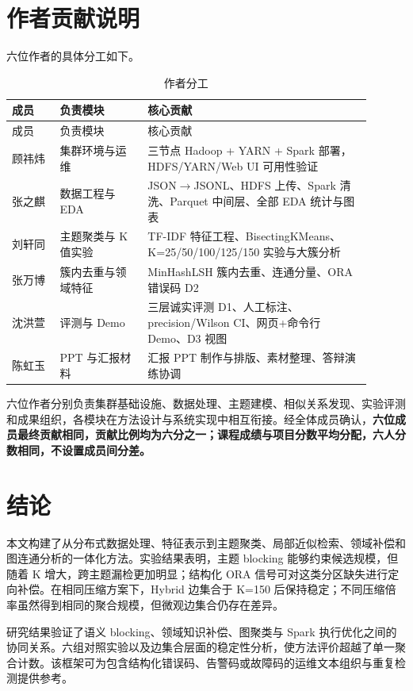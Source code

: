 \documentclass[a4paper,UTF8,zihao=5,fontset=windows]{ctexart}
\begin{document}
\section{作者贡献说明}

六位作者的具体分工如下。

\begin{longtable}{p{0.12\linewidth}p{0.22\linewidth}p{0.56\linewidth}}
\caption{作者分工}\\
\toprule
成员 & 负责模块 & 核心贡献 \\
\midrule
\endfirsthead
\toprule
成员 & 负责模块 & 核心贡献 \\
\midrule
\endhead
\bottomrule
\endlastfoot
顾祎炜 & 集群环境与运维 & 三节点 Hadoop + YARN + Spark 部署，HDFS/YARN/Web UI 可用性验证 \\
张之麒 & 数据工程与 EDA & JSON$\rightarrow$JSONL、HDFS 上传、Spark 清洗、Parquet 中间层、全部 EDA 统计与图表 \\
刘轩同 & 主题聚类与 K 值实验 & TF-IDF 特征工程、BisectingKMeans、K=25/50/100/125/150 实验与大簇分析 \\
张万博 & 簇内去重与领域特征 & MinHashLSH 簇内去重、连通分量、ORA 错误码 D2 \\
沈洪萱 & 评测与 Demo & 三层诚实评测 D1、人工标注、precision/Wilson CI、网页+命令行 Demo、D3 视图 \\
陈虹玉 & PPT 与汇报材料 & 汇报 PPT 制作与排版、素材整理、答辩演练协调 \\
\end{longtable}

六位作者分别负责集群基础设施、数据处理、主题建模、相似关系发现、实验评测和成果组织，各模块在方法设计与系统实现中相互衔接。经全体成员确认，\textbf{六位成员最终贡献相同，贡献比例均为六分之一；课程成绩与项目分数平均分配，六人分数相同，不设置成员间分差。}

\section{结论}

本文构建了从分布式数据处理、特征表示到主题聚类、局部近似检索、领域补偿和图连通分析的一体化方法。实验结果表明，主题 blocking 能够约束候选规模，但随着 K 增大，跨主题漏检更加明显；结构化 ORA 信号可对这类分区缺失进行定向补偿。在相同压缩方案下，Hybrid 边集合于 K=150 后保持稳定；不同压缩倍率虽然得到相同的聚合规模，但微观边集合仍存在差异。

研究结果验证了语义 blocking、领域知识补偿、图聚类与 Spark 执行优化之间的协同关系。六组对照实验以及边集合层面的稳定性分析，使方法评价超越了单一聚合计数。该框架可为包含结构化错误码、告警码或故障码的运维文本组织与重复检测提供参考。
\end{document}
